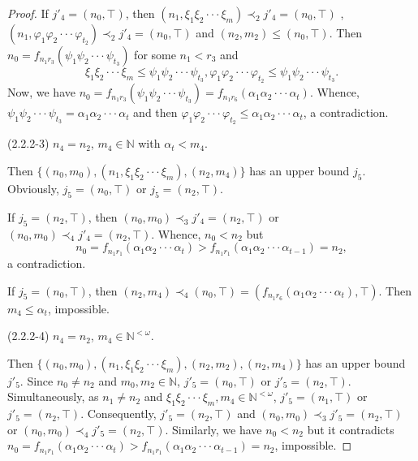 \documentclass[preprint,12pt]{elsarticle}
\numberwithin{equation}{section}
\begin{document}
\begin{proof}
If $j'_{4}=(n_{0},\top)$, then $(n_{1},\xi_{1}\xi_{2}\cdot\cdot\cdot\xi_{m})\prec_{2}j'_{4}=(n_{0},\top)$ , $(n_{1},\varphi_{1}\varphi_{2}\cdot\cdot\cdot\varphi_{t_{2}})\prec_{2}j'_{4}=(n_{0},\top)$ and $(n_{2},m_{2})\leq(n_{0},\top)$.
Then $n_{0}=f_{n_{1}r_{3}}(\psi_{1}\psi_{2}\cdot\cdot\cdot\psi_{t_{3}})$ for some $n_{1}<r_{3}$ and $$\xi_{1}\xi_{2}\cdot\cdot\cdot\xi_{m}\leq\psi_{1}\psi_{2}\cdot\cdot\cdot\psi_{t_{3}}, \varphi_{1}\varphi_{2}\cdot\cdot\cdot\varphi_{t_{2}}\leq\psi_{1}\psi_{2}\cdot\cdot\cdot\psi_{t_{3}}. $$ Now, we have $n_{0}=f_{n_{1}r_{3}}(\psi_{1}\psi_{2}\cdot\cdot\cdot\psi_{t_{3}})=f_{n_{1}r_{6}}(\alpha_{1}\alpha_{2}\cdot\cdot\cdot\alpha_{t})$. Whence, $\psi_{1}\psi_{2}\cdot\cdot\cdot\psi_{t_{3}}=\alpha_{1}\alpha_{2}\cdot\cdot\cdot\alpha_{t}$ and then $\varphi_{1}\varphi_{2}\cdot\cdot\cdot\varphi_{t_{2}}\leq\alpha_{1}\alpha_{2}\cdot\cdot\cdot\alpha_{t}$, a contradiction.

(2.2.2-3) $n_{4}=n_{2}$, $m_{4}\in\mathbb{N}$ with $\alpha_{t}<m_{4}$.

Then $\{(n_{0},m_{0}),(n_{1},\xi_{1}\xi_{2}\cdot\cdot\cdot\xi_{m}),(n_{2},m_{4})\}$ has an upper bound $j_{5}$. Obviously, $j_{5}=(n_{0},\top)$ or $j_{5}=(n_{2},\top)$.

If $j_{5}=(n_{2},\top)$, then $(n_{0},m_{0})\prec_{3}j'_{4}=(n_{2},\top)$ or $(n_{0},m_{0})\prec_{4}j'_{4}=(n_{2},\top)$. Whence, $n_{0}<n_{2}$ but $$n_{0}=f_{n_{1}r_{1}}(\alpha_{1}\alpha_{2}\cdot\cdot\cdot\alpha_{t})>f_{n_{1}r_{1}}(\alpha_{1}\alpha_{2}\cdot\cdot\cdot\alpha_{t-1})=n_{2},$$ a contradiction.

If $j_{5}=(n_{0},\top)$, then $(n_{2},m_{4})\prec_{4}(n_{0},\top)=(f_{n_{1}r_{6}}(\alpha_{1}\alpha_{2}\cdot\cdot\cdot\alpha_{t}),\top)$. Then $m_{4}\leq\alpha_{t}$, impossible.

(2.2.2-4) $n_{4}=n_{2}$, $m_{4}\in\mathbb{N}^{<\omega}$.

Then $\{(n_{0},m_{0}),(n_{1},\xi_{1}\xi_{2}\cdot\cdot\cdot\xi_{m}),(n_{2},m_{2}),(n_{2},m_{4})\}$ has an upper bound $j'_{5}$. Since $n_{0}\neq n_{2}$ and $m_{0}, m_{2}\in\mathbb{N}$, $j'_{5}=(n_{0},\top)$ or $j'_{5}=(n_{2},\top)$. Simultaneously, as  $n_{1}\neq n_{2}$ and $\xi_{1}\xi_{2}\cdot\cdot\cdot\xi_{m}, m_{4}\in\mathbb{N}^{<\omega}$, $j'_{5}=(n_{1},\top)$ or $j'_{5}=(n_{2},\top)$. Consequently, $j'_{5}=(n_{2},\top)$ and $(n_{0},m_{0})\prec_{3}j'_{5}=(n_{2},\top)$ or $(n_{0},m_{0})\prec_{4}j'_{5}=(n_{2},\top)$. Similarly, we have $n_{0}<n_{2}$ but it contradicts  $n_{0}=f_{n_{1}r_{1}}(\alpha_{1}\alpha_{2}\cdot\cdot\cdot\alpha_{t})>f_{n_{1}r_{1}}(\alpha_{1}\alpha_{2}\cdot\cdot\cdot\alpha_{t-1})=n_{2}$, impossible.


\end{proof}
\end{document}
